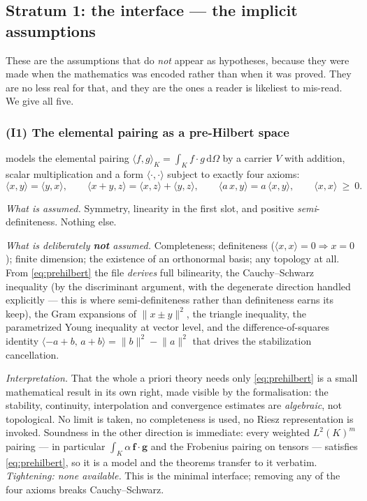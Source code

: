 \documentclass[11pt]{article}
\newcommand{\file}[1]{\texttt{\detokenize{#1}}}
\begin{document}
\subsection{Stratum 1: the interface --- the implicit assumptions}\label{sec:stratum1}

These are the assumptions that do \emph{not} appear as hypotheses, because they
were made when the mathematics was encoded rather than when it was proved. They
are no less real for that, and they are the ones a reader is likeliest to
mis-read. We give all five.

\subsubsection{(I1) The elemental pairing as a pre-Hilbert space}

\file{InnerSpace.v} models the elemental pairing
$\langle f,g\rangle_K = \int_K f\cdot g\,\mathrm d\Omega$ by a carrier $V$ with
addition, scalar multiplication and a form $\langle\cdot,\cdot\rangle$ subject
to exactly four axioms:
\begin{equation}\label{eq:prehilbert}
  \langle x,y\rangle=\langle y,x\rangle,\qquad
  \langle x+y,z\rangle=\langle x,z\rangle+\langle y,z\rangle,\qquad
  \langle a\,x,y\rangle=a\,\langle x,y\rangle,\qquad
  \langle x,x\rangle\ \ge\ 0 .
\end{equation}

\emph{What is assumed.} Symmetry, linearity in the first slot, and positive
\emph{semi}-definiteness. Nothing else.

\emph{What is deliberately \textbf{not} assumed.} Completeness; definiteness
($\langle x,x\rangle=0\Rightarrow x=0$); finite dimension; the existence of an
orthonormal basis; any topology at all. From \eqref{eq:prehilbert} the file
\emph{derives} full bilinearity, the Cauchy--Schwarz inequality (by the
discriminant argument, with the degenerate direction handled explicitly --- this
is where semi-definiteness rather than definiteness earns its keep), the Gram
expansions of $\lVert x\pm y\rVert^2$, the triangle inequality, the parametrized
Young inequality at vector level, and the difference-of-squares identity
$\langle -a+b,\,a+b\rangle=\lVert b\rVert^2-\lVert a\rVert^2$ that drives the
stabilization cancellation.

\emph{Interpretation.} That the whole a priori theory needs only
\eqref{eq:prehilbert} is a small mathematical result in its own right, made
visible by the formalisation: the stability, continuity, interpolation and
convergence estimates are \emph{algebraic}, not topological. No limit is taken,
no completeness is used, no Riesz representation is invoked. Soundness in the
other direction is immediate: every weighted $L^2(K)^m$ pairing --- in
particular $\int_K \alpha\,\mathbf f\!\cdot\!\mathbf g$ and the Frobenius pairing
on tensors --- satisfies \eqref{eq:prehilbert}, so it is a model and the theorems
transfer to it verbatim. \emph{Tightening: none available.} This is the minimal
interface; removing any of the four axioms breaks Cauchy--Schwarz.
\end{document}
